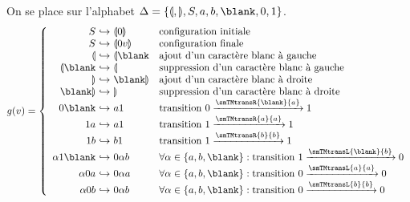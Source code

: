 \begin{exercice}
\begin{question}
\begin{center}
    \end{center}
  \end{question}
  \begin{correction}
    On se place sur l'alphabet $\Delta = \{\llparenthesis, \rrparenthesis, S, a, b, \blank, 0, 1\}$. 
    $$
    g(v) = 
    \left\{\begin{array}{r@{~\hookrightarrow~}ll}
    S               & \llparenthesis0\rrparenthesis  & \text{configuration initiale}\\
    S               & \llparenthesis0v\rrparenthesis & \text{configuration finale}\\
    \llparenthesis         & \llparenthesis\blank    & \text{ajout d'un caractère blanc à gauche}\\
    \llparenthesis\blank   & \llparenthesis          & \text{suppression d'un caractère blanc à gauche}\\
    \rrparenthesis         & \blank \rrparenthesis   & \text{ajout d'un caractère blanc à droite}\\
    \blank \rrparenthesis  & \rrparenthesis          & \text{suppression d'un caractère blanc à droite}\\
    0\blank         & a1               & \text{transition $0\xrightarrow{\smTMtransR{\blank}{a}} 1$}\\
    1a              & a1               & \text{transition $1\xrightarrow{\smTMtransR{a}{a}} 1$}\\
    1b              & b1               & \text{transition $1\xrightarrow{\smTMtransR{b}{b}} 1$}\\
    \alpha 1 \blank & 0 \alpha b & \forall \alpha \in \{a, b, \blank\} : \text{transition $1\xrightarrow{\smTMtransL{\blank}{b}} 0$}\\ 
    \alpha 0 a      & 0 \alpha a & \forall \alpha \in \{a, b, \blank\} : \text{transition $0\xrightarrow{\smTMtransL{a}{a}} 0$}\\ 
    \alpha 0 b      & 0 \alpha b & \forall \alpha \in \{a, b, \blank\} : \text{transition $0\xrightarrow{\smTMtransL{b}{b}} 0$}
    \end{array}\right.
    $$
  \end{correction}
  

\end{exercice}
